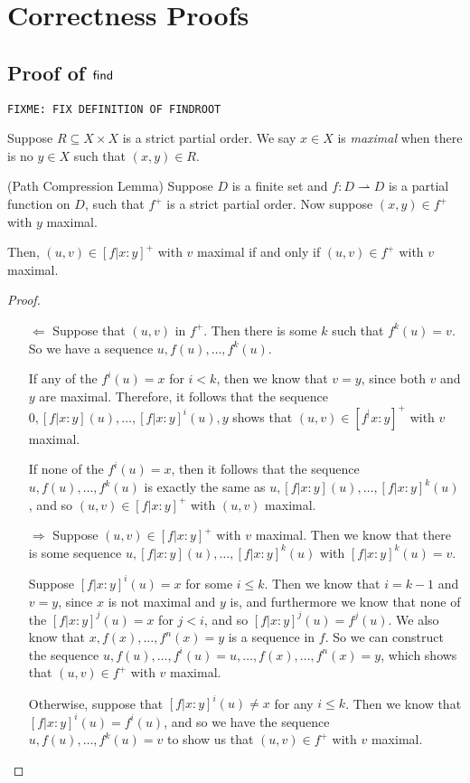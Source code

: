 \section{Correctness Proofs}

\subsection{Proof of $\mathsf{find}$}

\texttt{FIXME: FIX DEFINITION OF FINDROOT}

Suppose $R \subseteq X \times X$ is a strict partial order. We say $x \in X$ is \emph{maximal}
when there is no $y \in X$ such that $(x,y) \in R$. 

\begin{lemma}{(Path Compression Lemma)}
  Suppose $D$ is a finite set and $f : D \rightharpoonup D$ is a partial function on $D$,
such that $f^{+}$ is a strict partial order. Now suppose $(x,y) \in f^{+}$ with $y$ maximal.

Then, $(u,v) \in [f|x:y]^{+}$ with $v$ maximal if and only if $(u,v) \in f^{+}$ with $v$ maximal. 
\end{lemma}

\begin{proof}
\begin{itemize}
\item[$\Leftarrow$] Suppose that $(u, v)$ in $f^{+}$. Then there is some $k$ such 
that $f^k(u) = v$. So we have a sequence $u, f(u), \ldots, f^k(u)$. 

If any of the $f^i(u) = x$ for $i < k$, then we know that $v = y$,
since both $v$ and $y$ are maximal. Therefore, it follows that the
sequence $0, [f|x:y](u), \ldots, [f|x:y]^i(u), y$ shows that $(u,v)
\in [f^|x:y]^+$ with $v$ maximal.

If none of the $f^i(u) = x$, then it follows that the sequence $u,
f(u), \ldots, f^k(u)$ is exactly the same as $u, [f|x:y](u), \ldots,
[f|x:y]^k(u)$, and so $(u, v) \in [f|x:y]^+$ with $(u,v)$ maximal.

\item[$\Rightarrow$] Suppose $(u,v) \in [f|x:y]^{+}$ with $v$
  maximal. Then we know that there is some sequence $u, [f|x:y](u),
  \ldots, [f|x:y]^k(u)$ with $[f|x:y]^k(u) = v$.

Suppose $[f|x:y]^i(u) = x$ for some $i \leq k$. Then we know that $i =
k-1$ and $v = y$, since $x$ is not maximal and $y$ is, and furthermore
we know that none of the $[f|x:y]^j(u) = x$ for $j < i$, and so
$[f|x:y]^j(u) = f^j(u)$. We also know that $x, f(x), \ldots, f^n(x) =
y$ is a sequence in $f$. So we can construct the sequence $u, f(u),
\ldots, f^i(u) = u, \ldots, f(x), \ldots, f^n(x) = y$, which shows
that $(u,v) \in f^+$ with $v$ maximal.

Otherwise, suppose that $[f|x:y]^i(u) \not= x$ for any $i \leq
k$. Then we know that $[f|x:y]^i(u) = f^i(u)$, and so we have the
sequence $u, f(u), \ldots, f^k(u) = v$ to show us that $(u,v) \in f^+$ with
$v$ maximal.
\end{itemize}
\end{proof}

